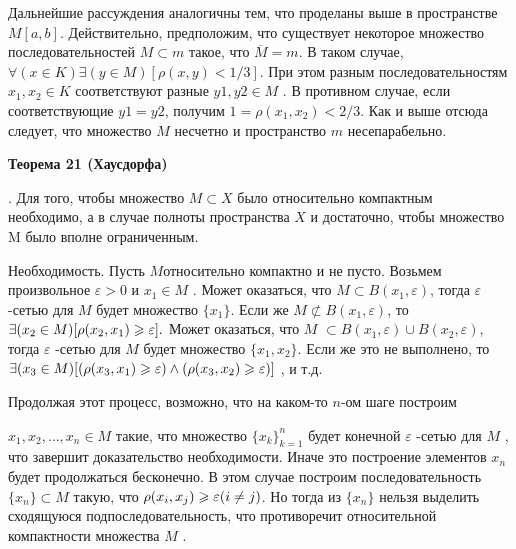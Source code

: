 \begin{enumerate}
              Дальнейшие рассуждения аналогичны тем, что проделаны выше в
              пространстве $M [a, b]$.
              Действительно, предположим, что существует некоторое множество
              последовательностей
              $M \subset m$ такое, что $\overline{M} = m$. В таком случае,
              $\forall(x  \in  K)\exists(y  \in  M )[ \rho(x, y)  <  1/3 ]$.
              При  этом  разным
              последовательностям
              $x_1, x_2 \in  K$ соответствуют разные $y1, y2 \in  M$ .
              В противном случае, если
              соответствующие $y1 = y2$, получим $1 = \rho(x_1, x_2) < 2/3$.
              Как и выше отсюда следует,
              что множество $M$ несчетно и пространство $m$ несепарабельно.
    \end{enumerate}


    \noindent\dotfill
    
    \textbf{Теорема 21 (Хаусдорфа) }

    \MS. Для того,
    чтобы множество $M \subset X$ было относительно компактным необходимо,
    а в случае
    полноты пространства $X$ и достаточно, чтобы множество M
    было вполне ограниченным.

    Необходимость. Пусть $M $относительно компактно и не пусто.
    Возьмем
    произвольное $\varepsilon  > 0$ и $x_1 \in  M$ . Может оказаться, что
$M  \subset B(x_1, \varepsilon )$,
    тогда
$\varepsilon$ -сетью для $M$ будет множество $\{x_1\}.$
    Если же $M  \not\subset B(x_1, \varepsilon )$, то
$\exists(x_2 \in  M )[ \rho(x_2, x_1) \geqslant \varepsilon  ].$
    Может оказаться, что $M$
$\subset B(x_1, \varepsilon ) \cup B(x_2, \varepsilon )$, тогда $\varepsilon$ -сетью для
$M$ будет множество
$\{x_1, x_2\}$. Если же это не выполнено, то
$\exists(x_3 \in  M )[ (\rho(x_3, x_1) \geqslant \varepsilon ) \wedge  (\rho(x_3, x_2) \geqslant \varepsilon ) ]$
    , и т.д.

    Продолжая этот процесс, возможно, что на каком-то $n$-ом шаге построим

$x_1, x_2, \dots, x_n \in  M$  такие, что множество $\{x_k\}^n_{k=1}$	будет конечной
$\varepsilon$ -сетью
    для $M$ , что завершит доказательство необходимости.
    Иначе это построение элементов
$x_n$ будет продолжаться бесконечно.
    В этом случае построим последовательность $\{x_n\} \subset M$  такую,
    что $\rho(x_i, x_j) \geqslant \varepsilon  (i\neq	j)$. Но тогда из
$\{x_n\}$
    нельзя выделить сходящуюся подпоследовательность, что противоречит
    относительной
    компактности множества $M$ .

